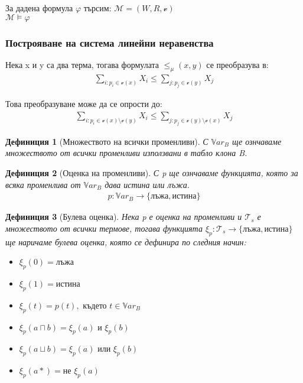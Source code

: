 \documentclass{beamer}
\newtheorem{defn}{Дефиниция}[section]
\newcommand{\Var}{\mathbb{V}ar}
\newcommand{\vE}{\mathscr{v}}
\newcommand{\vBool}{\xi}
\newcommand{\Ts}{\mathcal{T}_s}
\begin{document}
\begin{frame}
	\begin{center}
	За дадена формула $\varphi$ търсим: $\mathcal{M} = (W, R, \mathscr{v})$ \\
	$ \mathcal{M} \models \varphi$
	\end{center}
\end{frame}

\begin{frame}\frametitle{Построяване на система линейни неравенства}
	Нека x и y са два терма, тогава формулата $\le_\mu(x, y)$ се преобразува в:
	\begin{align*}
		\sum_{i: p_i \in \vE(x)} X_i \leq \sum_{j: p_j \in \vE(y)} X_j
	\end{align*}

			Това преобразуване може да се опрости до:
			\begin{align*}
				\sum_{i: p_i \in \vE(x) \setminus \vE(y)} X_i \leq \sum_{j: p_j \in \vE(y) \setminus \vE(x)} X_j
			\end{align*}
\end{frame}

\begin{frame}
\begin{defn}[Множеството на всички променливи]
	С $\Var_B$ ще ознчаваме множеството от всички променливи използвани в табло клона B.
\end{defn}

\begin{defn}[Оценка на променливи]
	С p ще ознчаваме функцията, която за всяка променлива от $\Var_B$ дава истина или лъжа.
		\begin{align*}
			p : \Var_B \rightarrow \{ \textbf{лъжа}, \textbf{истина}\}
		\end{align*}
\end{defn}
\end{frame}

\begin{frame}
\begin{defn}[Булева оценка]
		Нека p е оценка на променливи и $\Ts$ е множеството от всички термове, тогава 
		функцията $\vBool_p : \Ts \rightarrow \{ \textbf{лъжа}, \textbf{истина}\}$ ще наричаме булева оценка, която се дефинира по следния начин:
		\begin{itemize}
			\item $\vBool_p(0) = \textbf{лъжа}$
			\item $\vBool_p(1) = \textbf{истина}$
			\item $\vBool_p(t) =p(t), \textit{ където } t \in \Var_B$
			\item $\vBool_p(a \sqcap b) = \vBool_p(a) \textit{ и } \vBool_p(b)$
			\item $\vBool_p(a \sqcup b) = \vBool_p(a) \textit{ или } \vBool_p(b)$
			\item $\vBool_p(a*) = \textit{не } \vBool_p(a)$
		\end{itemize}
\end{defn}
\end{frame}
\end{document}
